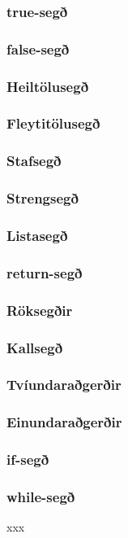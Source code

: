 \documentclass[12pt,a4paper]{article}
\begin{document}
\subsubsection{true-segð}
\subsubsection{false-segð}
\subsubsection{Heiltölusegð}
\subsubsection{Fleytitölusegð}
\subsubsection{Stafsegð}
\subsubsection{Strengsegð}
\subsubsection{Listasegð}
\subsubsection{return-segð}
\subsubsection{Röksegðir}
\subsubsection{Kallsegð}
\subsubsection{Tvíundaraðgerðir}
\subsubsection{Einundaraðgerðir}
\subsubsection{if-segð}
\subsubsection{while-segð}
xxx
\end{document}
